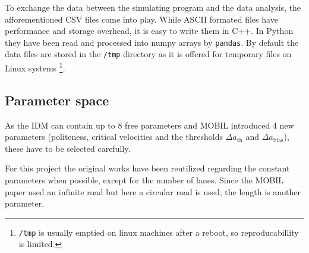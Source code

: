 To exchange the data between the simulating program and the data analysis, the afforementioned 
CSV files come into play. While ASCII formated files have performance and storage 
overhead, it is easy to write them in C++. In Python they have been read and
processed into numpy arrays by \texttt{pandas}. By default the data files are stored in the
\texttt{/tmp} directory as it is offered for temporary files on Linux systems
\footnote{\texttt{/tmp} is usually emptied on linux machines after a reboot, so reproducabillity is
limited.}.


\subsection{Parameter space}
\label{sec:parameters}
As the IDM can contain up to 8 free parameters and MOBIL introduced 4 new parameters (politeness,
critical velocities and the thresholds $\Delta a_\text{th}$ and $\Delta a_\text{bias}$), these have
to be selected carefully. 

For this project the original works have been reutilized regarding the constant parameters when
possible, except for the number of lanes. Since the MOBIL paper used an infinite road but here a 
circular road is used, the length is another parameter. 

